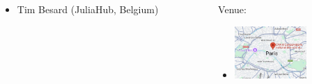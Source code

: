 \documentclass[]{beamer}
\begin{document}
\begin{frame}
\begin{columns}
\begin{column}{0.575\textwidth}
\begin{itemize}
\item[] Tim Besard (JuliaHub, Belgium)\vspace{-1mm}
\end{itemize}
\vspace{4mm}
      \end{column}
      \begin{column}{0.35\textwidth}
Venue:\vspace{2mm}\\
\begin{itemize}
\item[] \includegraphics[height=2.0cm]{localisationCNAM.png} 
\end{itemize}
      \end{column}
    \end{columns}






\end{frame}
\end{document}
